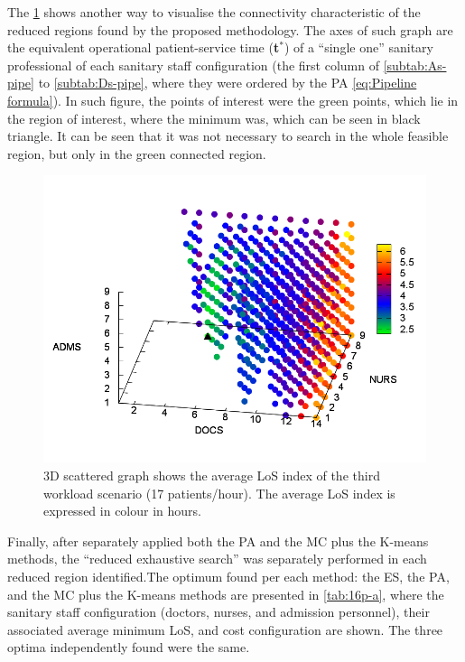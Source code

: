 The \ref{fig:3D-scattered-graph-100} shows another way to visualise
the connectivity characteristic of the reduced regions found by the
proposed methodology. The axes of such graph are the equivalent operational
patient-service time ({\bf t$^*$}) of a ``single
one'' sanitary professional of each sanitary staff configuration
(the first column of \ref{subtab:As-pipe} to \ref{subtab:Ds-pipe},
where they were ordered by the PA \ref{eq:Pipeline formula}). In
such figure, the points of interest were the green points, which lie
in the region of interest, where the minimum was, which can be seen
in black triangle. It can be seen that it was not necessary to search
in the whole feasible region, but only in the green connected region.
\begin{figure}[h]
\noindent \centering{}\includegraphics[width=0.88\columnwidth,height=0.2\paperheight]{figs4/v0/6400-602-100-3D-scatter-LoS2}\caption{3D scattered graph shows the average LoS index of the third workload
scenario (17 patients/hour). The average LoS index is expressed in
colour in hours. \label{fig:3D-scattered-graph-100}}
\end{figure}


Finally, after separately applied both the PA and the MC plus the
K-means methods, the \textquotedblleft{}reduced exhaustive search\textquotedblright{}
was separately performed in each reduced region identified.The optimum
found per each method: the ES, the PA, and the MC plus the K-means
methods are presented in \ref{tab:16p-a}, where the sanitary staff
configuration (doctors, nurses, and admission personnel), their associated
average minimum LoS, and cost configuration are shown. The three optima
independently found were the same. 

